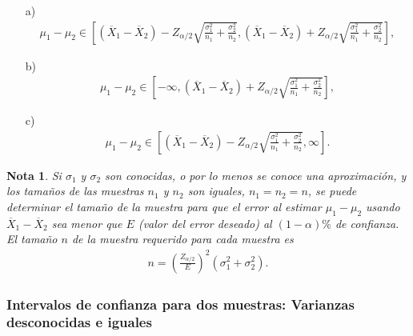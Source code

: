 \documentclass[a4paper]{report} %
\newtheorem{Note}{Nota}[chapter]
\begin{document}
\begin{itemize}
\item[a) ] \begin{eqnarray}\mu_{1}-\mu_{2}\in \left[\left(\overline{X}_{1}-\overline{X}_{2}\right)-Z_{\alpha/2}\sqrt{\frac{\sigma_{1}^{2}}{n_{1}}+\frac{\sigma_{2}^{2}}{n_{2}}},\left(\overline{X}_{1}-\overline{X}_{2}\right)+Z_{\alpha/2}\sqrt{\frac{\sigma_{1}^{2}}{n_{1}}+\frac{\sigma_{2}^{2}}{n_{2}}}\right],\end{eqnarray}

\item[b) ] \begin{eqnarray}\mu_{1}-\mu_{2}\in \left[-\infty,\left(\overline{X}_{1}-\overline{X}_{2}\right)+Z_{\alpha/2}\sqrt{\frac{\sigma_{1}^{2}}{n_{1}}+\frac{\sigma_{2}^{2}}{n_{2}}}\right],\end{eqnarray}

\item[c) ] \begin{eqnarray}\mu_{1}-\mu_{2}\in \left[\left(\overline{X}_{1}-\overline{X}_{2}\right)-Z_{\alpha/2}\sqrt{\frac{\sigma_{1}^{2}}{n_{1}}+\frac{\sigma_{2}^{2}}{n_{2}}},\infty\right].\end{eqnarray}
\end{itemize}

\begin{Note}
Si $\sigma_{1}$ y $\sigma_{2}$ son conocidas, o por lo menos se conoce una aproximaci\'on, y los tama\~nos de las muestras $n_{1}$ y $n_{2}$ son iguales, $n_{1}=n_{2}=n$, se puede determinar el tama\~no de la muestra para que el error al estimar $\mu_{1}-\mu_{2}$ usando $\overline{X}_{1}-\overline{X}_{2}$ sea menor que $E$ (valor del error deseado) al $\left(1-\alpha\right)\%$ de confianza. El tama\~no $n$ de la muestra requerido para cada muestra es
\begin{eqnarray}
n=\left(\frac{Z_{\alpha/2}}{E}\right)^{2}\left(\sigma_{1}^{2}+\sigma_{2}^{2}\right).
\end{eqnarray}
\end{Note}

\subsubsection{Intervalos de confianza para dos muestras: Varianzas desconocidas e iguales}
\end{document}
